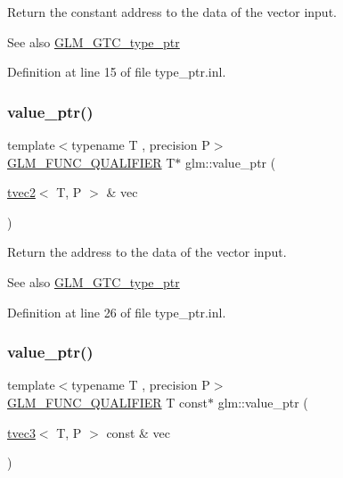 Return the constant address to the data of the vector input. \begin{DoxySeeAlso}{See also}
\mbox{\hyperlink{group__gtc__type__ptr}{G\+L\+M\+\_\+\+G\+T\+C\+\_\+type\+\_\+ptr}} 
\end{DoxySeeAlso}


Definition at line 15 of file type\+\_\+ptr.\+inl.

\mbox{\label{group__gtc__type__ptr_gabd3cc713184a2093862605f5f0abb8a4}} 
\subsubsection{\texorpdfstring{value\_ptr()}{value\_ptr()}\hspace{0.1cm}{\footnotesize\ttfamily [2/27]}}
{\footnotesize\ttfamily template$<$typename T , precision P$>$ \\
\mbox{\hyperlink{setup_8hpp_a33fdea6f91c5f834105f7415e2a64407}{G\+L\+M\+\_\+\+F\+U\+N\+C\+\_\+\+Q\+U\+A\+L\+I\+F\+I\+ER}} T$\ast$ glm\+::value\+\_\+ptr (\begin{DoxyParamCaption}\item[{\mbox{\hyperlink{structglm_1_1tvec2}{tvec2}}$<$ T, P $>$ \&}]{vec }\end{DoxyParamCaption})}

Return the address to the data of the vector input. \begin{DoxySeeAlso}{See also}
\mbox{\hyperlink{group__gtc__type__ptr}{G\+L\+M\+\_\+\+G\+T\+C\+\_\+type\+\_\+ptr}} 
\end{DoxySeeAlso}


Definition at line 26 of file type\+\_\+ptr.\+inl.

\mbox{\label{group__gtc__type__ptr_gac04db5d9c05bd3d50140f34f8695a08c}} 
\subsubsection{\texorpdfstring{value\_ptr()}{value\_ptr()}\hspace{0.1cm}{\footnotesize\ttfamily [3/27]}}
{\footnotesize\ttfamily template$<$typename T , precision P$>$ \\
\mbox{\hyperlink{setup_8hpp_a33fdea6f91c5f834105f7415e2a64407}{G\+L\+M\+\_\+\+F\+U\+N\+C\+\_\+\+Q\+U\+A\+L\+I\+F\+I\+ER}} T const$\ast$ glm\+::value\+\_\+ptr (\begin{DoxyParamCaption}\item[{\mbox{\hyperlink{structglm_1_1tvec3}{tvec3}}$<$ T, P $>$ const \&}]{vec }\end{DoxyParamCaption})}

